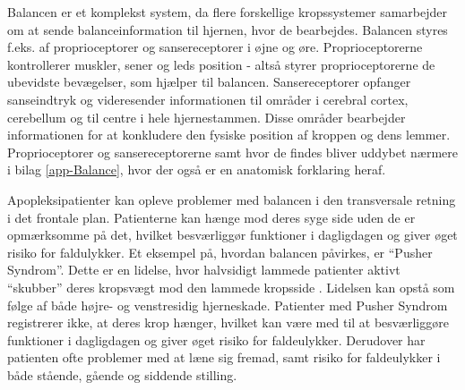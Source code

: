 Balancen er et komplekst system, da flere forskellige kropssystemer samarbejder om at sende balanceinformation til hjernen, hvor de bearbejdes. Balancen styres f.eks. af proprioceptorer og sansereceptorer i øjne og øre. Proprioceptorerne kontrollerer muskler, sener og leds position - altså styrer proprioceptorerne de ubevidste bevægelser, som hjælper til balancen. \cite{Martini2012} Sansereceptorer opfanger sanseindtryk og videresender informationen til områder i cerebral cortex, cerebellum og til centre i hele hjernestammen. Disse områder bearbejder informationen for at konkludere den fysiske position af kroppen og dens lemmer. \cite{Martini2012,Karnath2003} Proprioceptorer og sansereceptorerne samt hvor de findes bliver uddybet nærmere i bilag \ref{app-Balance}, hvor der også er en anatomisk forklaring heraf.

Apopleksipatienter kan opleve problemer med balancen i den transversale retning i det frontale plan. Patienterne kan hænge mod deres syge side uden de er opmærksomme på det, hvilket besværliggør funktioner i dagligdagen og giver øget risiko for faldulykker. Et eksempel på, hvordan balancen påvirkes, er “Pusher Syndrom”. Dette er en lidelse, hvor halvsidigt lammede patienter aktivt “skubber” deres kropsvægt mod den lammede kropsside \cite{Karnath2003}. Lidelsen kan opstå som følge af både højre- og venstresidig hjerneskade. Patienter med Pusher Syndrom registrerer ikke, at deres krop hænger, hvilket kan være med til at besværliggøre funktioner i dagligdagen og giver øget risiko for faldeulykker. Derudover har patienten ofte problemer med at læne sig fremad, samt risiko for faldeulykker i både stående, gående og siddende stilling. \cite{Karnath2003} 

